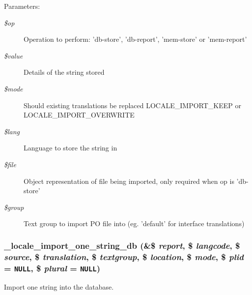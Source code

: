 \begin{Desc}
\item[Parameters:]
\begin{description}
\item[{\em \$op}]Operation to perform: 'db-store', 'db-report', 'mem-store' or 'mem-report' \item[{\em \$value}]Details of the string stored \item[{\em \$mode}]Should existing translations be replaced LOCALE\_\-IMPORT\_\-KEEP or LOCALE\_\-IMPORT\_\-OVERWRITE \item[{\em \$lang}]Language to store the string in \item[{\em \$file}]Object representation of file being imported, only required when op is 'db-store' \item[{\em \$group}]Text group to import PO file into (eg. 'default' for interface translations) \end{description}
\end{Desc}
\hypertarget{group__locale_g9f159bc412475f146434c43b69d0ab89}{
\subsubsection[{\_\-locale\_\-import\_\-one\_\-string\_\-db}]{\setlength{\rightskip}{0pt plus 5cm}\_\-locale\_\-import\_\-one\_\-string\_\-db (\&\$ {\em report}, \/  \$ {\em langcode}, \/  \$ {\em source}, \/  \$ {\em translation}, \/  \$ {\em textgroup}, \/  \$ {\em location}, \/  \$ {\em mode}, \/  \$ {\em plid} = {\tt NULL}, \/  \$ {\em plural} = {\tt NULL})}}
\label{group__locale_g9f159bc412475f146434c43b69d0ab89}


Import one string into the database.

